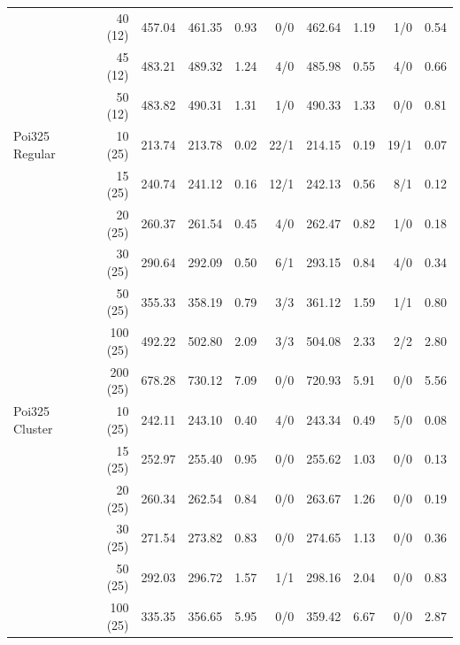\documentclass[preprint,review,12pt,authoryear]{elsarticle}
\begin{document}
\begin{table}[p]
{\begin{tabular}{lr r rrr rrr r}
       & 40 (12) & 457.04 & 461.35 & 0.93 & 0/0 & 462.64 & 1.19 & 1/0 & 0.54 \\
       & 45 (12) & 483.21 & 489.32 & 1.24 & 4/0 & 485.98 & 0.55 & 4/0 & 0.66 \\
       & 50 (12) & 483.82 & 490.31 & 1.31 & 1/0 & 490.33 & 1.33 & 0/0 & 0.81 \\
\midrule
Poi325 Regular & 10 (25) & 213.74 & 213.78 & 0.02 & 22/1 & 214.15 & 0.19 & 19/1 & 0.07 \\
               & 15 (25) & 240.74 & 241.12 & 0.16 & 12/1 & 242.13 & 0.56 & 8/1 & 0.12 \\
               & 20 (25) & 260.37 & 261.54 & 0.45 & 4/0 & 262.47 & 0.82 & 1/0 & 0.18 \\
               & 30 (25) & 290.64 & 292.09 & 0.50 & 6/1 & 293.15 & 0.84 & 4/0 & 0.34 \\
               & 50 (25) & 355.33 & 358.19 & 0.79 & 3/3 & 361.12 & 1.59 & 1/1 & 0.80 \\
               & 100 (25) & 492.22 & 502.80 & 2.09 & 3/3 & 504.08 & 2.33 & 2/2 & 2.80 \\
               & 200 (25) & 678.28 & 730.12 & 7.09 & 0/0 & 720.93 & 5.91 & 0/0 & 5.56 \\
\midrule
Poi325 Cluster & 10 (25) & 242.11 & 243.10 & 0.40 & 4/0 & 243.34 & 0.49 & 5/0 & 0.08 \\
               & 15 (25) & 252.97 & 255.40 & 0.95 & 0/0 & 255.62 & 1.03 & 0/0 & 0.13 \\
               & 20 (25) & 260.34 & 262.54 & 0.84 & 0/0 & 263.67 & 1.26 & 0/0 & 0.19 \\
               & 30 (25) & 271.54 & 273.82 & 0.83 & 0/0 & 274.65 & 1.13 & 0/0 & 0.36 \\
               & 50 (25) & 292.03 & 296.72 & 1.57 & 1/1 & 298.16 & 2.04 & 0/0 & 0.83 \\
               & 100 (25) & 335.35 & 356.65 & 5.95 & 0/0 & 359.42 & 6.67 & 0/0 & 2.87 \\
\bottomrule
\end{tabular}}
\end{table}
\end{document}
